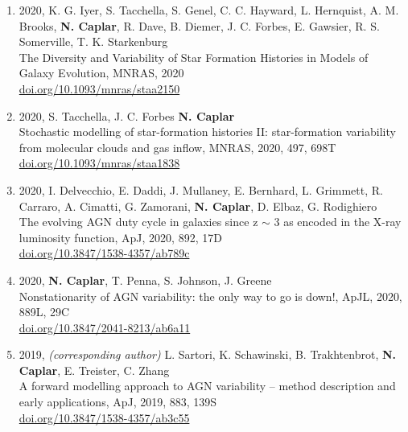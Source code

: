 \documentclass[11pt,letterpaper]{article}
\begin{document}
\begin{enumerate}
\item 2020, K. G. Iyer, S. Tacchella, S. Genel, C. C. Hayward, L. Hernquist, A. M. Brooks,  \textbf{N. Caplar}, R. Dave, B. Diemer, J. C. Forbes, E. Gawsier, R. S. Somerville, T. K. Starkenburg   \\
The Diversity and Variability of Star Formation Histories in Models of Galaxy Evolution,  MNRAS, 2020\\
\href{https://doi.org/10.1093/mnras/staa2150}{doi.org/10.1093/mnras/staa2150}\\

\item 2020,  S. Tacchella, J. C. Forbes  \textbf{N. Caplar}\\
Stochastic modelling of star-formation histories II: star-formation variability from molecular clouds and gas inflow,  MNRAS, 2020, 497, 698T\\
\href{https://doi.org/10.1093/mnras/staa1838}{doi.org/10.1093/mnras/staa1838} \\

\item 2020,  I. Delvecchio, E. Daddi, J. Mullaney, E. Bernhard, L. Grimmett, R. Carraro, A. Cimatti, G. Zamorani,  \textbf{N. Caplar}, D. Elbaz, G. Rodighiero \\
The evolving AGN duty cycle in galaxies since z $\sim$ 3 as encoded in the X-ray luminosity function, ApJ, 2020, 892, 17D\\
\href{https://doi.org/10.3847/1538-4357/ab789c}{doi.org/10.3847/1538-4357/ab789c} \\

\item 2020, \textbf{N. Caplar}, T. Penna, S. Johnson, J. Greene \\
Nonstationarity of AGN variability: the only way to go is down!, ApJL, 2020, 889L, 29C\\
\href{https://doi.org/10.3847/2041-8213/ab6a11}{doi.org/10.3847/2041-8213/ab6a11} \\

\item 2019, \textit{(corresponding author)} L. Sartori, K. Schawinski, B. Trakhtenbrot, \textbf{N. Caplar}, E. Treister, C. Zhang\\
A forward modelling approach to AGN variability – method
description and early applications, ApJ, 2019, 883, 139S\\
\href{https://doi.org/10.3847/1538-4357/ab3c55}{doi.org/10.3847/1538-4357/ab3c55} \\


\end{enumerate}
\end{document}
